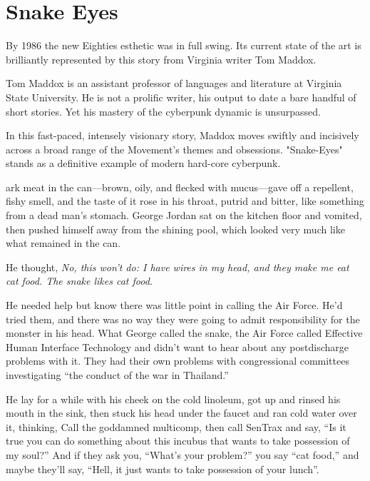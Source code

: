 \chapter{Snake Eyes}

By 1986 the new Eighties esthetic was in full swing. Its current state of the art is brilliantly represented by this story from Virginia writer Tom Maddox.

Tom Maddox is an assistant professor of languages and literature at Virginia State University. He is not a prolific writer, his output to date a bare handful of short stories. Yet his mastery of the cyberpunk dynamic is unsurpassed.

In this fast-paced, intensely visionary story, Maddox moves swiftly and incisively across a broad range of the Movement's themes and obsessions. "Snake-Eyes" stands as a definitive example of modern hard-core cyberpunk.

\hrulefill

ark meat in the can—brown, oily, and flecked with mucus—gave off a repellent, fishy smell, and the taste of it rose in his throat, putrid and bitter, like something from a dead man's stomach. George Jordan sat on the kitchen floor and vomited, then pushed himself away from the shining pool, which looked very much like what remained in the can.

He thought, \textit{No, this won't do: I have wires in my head, and they make me eat cat food. The snake likes cat food.}

He needed help but know there was little point in calling the Air Force. He'd tried them, and there was no way they were going to admit responsibility for the monster in his head. What George called the snake, the Air Force called Effective Human Interface Technology and didn't want to hear about any postdischarge problems with it. They had their own problems with congressional committees investigating ``the conduct of the war in Thailand.''

He lay for a while with his cheek on the cold linoleum, got up and rinsed his mouth in the sink, then stuck his head under the faucet and ran cold water over it, thinking, Call the goddamned multicomp, then call SenTrax and say, ``Is it true you can do something about this incubus that wants to take possession of my soul?'' And if they ask you, ``What's your problem?'' you say ``cat food,'' and maybe they'll say, ``Hell, it just wants to take possession of your lunch''.

